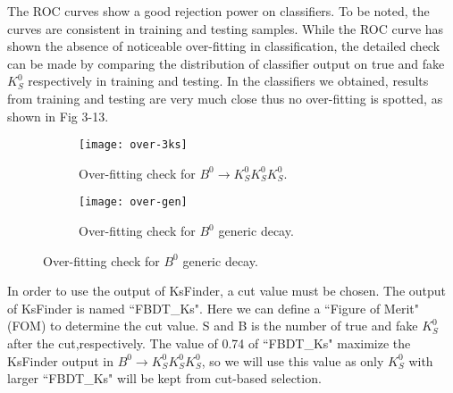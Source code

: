 \begin{comment}
\begin{figure}[H]
	\begin{minipage}[b]{0.5\linewidth}
		\centering 
		\texttt{[image: jpsi-jpsi]}
		\label{fig:side:a}
	\end{minipage}
	\begin{minipage}[b]{0.5\linewidth}
		\centering 
		\texttt{[image: jpsi-jpsi-pur]}
		\label{fig:side:b}
	\end{minipage}
	\caption{The left is ROC curve and the right is efficiency and purity depending on cut of classifier output. Results are from $B^0 \to J/\psi K_S^0$ generic decay sample.}
\end{figure}
\end{comment}


The ROC curves show a good rejection power on classifiers. To be noted, the curves are consistent in training and testing samples. 
While the ROC curve has shown the absence of noticeable over-fitting in classification, the detailed check can be made by comparing the distribution of classifier output on true and fake $K_S^0$ respectively in training and testing. In the classifiers we obtained, results from training and testing are very much close thus no over-fitting is spotted, as shown in Fig 3-13.
\begin{figure}[H]
	\begin{subfigure}{1\linewidth}
		\centering
		\texttt{[image: over-3ks]}
		\caption{Over-fitting check for $B^0 \to K_S^0  K_S^0  K_S^0$.}
	\end{subfigure}
  	\vspace{0.3cm}

	\begin{subfigure}{1\linewidth}
		\centering
		\texttt{[image: over-gen]}
		\caption{Over-fitting check for $B^0$ generic decay.}
	\end{subfigure}
	\vspace{0.3cm}
	
\end{figure}

In order to use the output of KsFinder, a cut value must be chosen. The output of KsFinder is named ``FBDT\_Ks". Here we can define a ``Figure of Merit" (FOM) to determine the cut value. S and B is the number of true and fake $K_S^0$ after the cut,respectively. The value of 0.74 of ``FBDT\_Ks" maximize the KsFinder output in $B^0 \to K_S^0  K_S^0  K_S^0$, so we will use this value as only $K_S^0$ with larger ``FBDT\_Ks" will be kept from cut-based selection.

